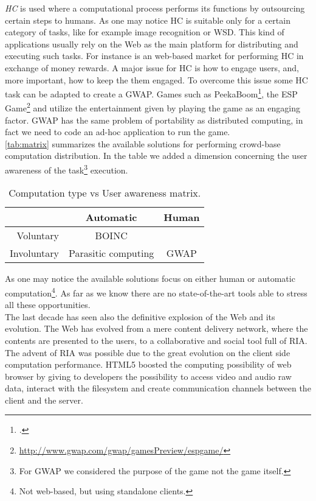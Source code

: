 \emph{\acl{HC}} is used  where a computational process performs its
functions by outsourcing certain steps to humans. As one may notice \ac{HC}
is suitable only for a certain category of tasks, like for example image
recognition or \acl{WSD}. This kind of applications usually rely on the Web
as the main platform for distributing and executing such tasks. For instance
 is an web-based market for performing \ac{HC} in exchange of
money rewards.
A major issue for \ac{HC} is how to engage users, and, more important, how to keep
the them engaged. To overcome this issue some \ac{HC} task can be adapted to create
a \ac{GWAP}. Games such as PeekaBoom\footcite{von2006peekaboom}, the
ESP Game\footnote{\url{http://www.gwap.com/gwap/gamesPreview/espgame/}} and
 utilize the entertainment given by playing the game as an
engaging factor. \ac{GWAP} has the same problem of portability as distributed
computing, in fact we need to code an ad-hoc application to run the game.\\



\autoref{tab:matrix} summarizes the available solutions for performing crowd-base
computation distribution. In the table we added a dimension concerning the user
awareness of the task\footnote{For \ac{GWAP} we considered the purpose of the
game not the game itself.} execution.
\begin{table}[htb]
	\caption{Computation type vs User awareness matrix.}
	\label{tab:matrix}
	\centering
	\begin{tabular}{r|c|c}
		 & \textbf{Automatic} & \textbf{Human}\\
		\hline
		Voluntary & \acs{BOINC} & \citetitle{turk}\\
		\hline
		Involuntary & Parasitic computing & \acs{GWAP}
	\end{tabular}
\end{table}
As one may notice the available solutions focus on either human or automatic
computation\footnote{Not web-based, but using standalone clients.}. As far as we
know there are no state-of-the-art tools able to stress all these opportunities.\\

The last decade has seen also the definitive explosion of the Web and its evolution.
The Web has evolved from a mere content delivery network, where the contents are
presented to the users, to a collaborative and social tool full of \ac{RIA}. The
advent of \ac{RIA} was possible due to the great evolution on the client side
computation performance. \acs{HTML}5 boosted the computing possibility of web
browser by giving to developers the possibility to access video and audio raw data,
interact with the filesystem and create communication channels between the client
and the server.\\


